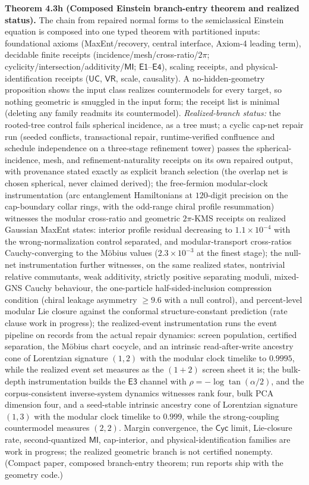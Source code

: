 \textbf{Theorem 4.3h (Composed Einstein branch-entry theorem and realized status).} The chain from repaired normal forms to the semiclassical Einstein equation is composed into one typed theorem with partitioned inputs: foundational axioms (MaxEnt/recovery, central interface, Axiom-4 leading term), decidable finite receipts (incidence/mesh/cross-ratio/\(2\pi\); cyclicity/intersection/additivity/\(\mathsf{MI}\); \(\mathsf{E1}\)--\(\mathsf{E4}\)), scaling receipts, and physical-identification receipts (\(\mathsf{UC}\), \(\mathsf{VR}\), scale, causality). A no-hidden-geometry proposition shows the input class realizes countermodels for every target, so nothing geometric is smuggled in the input form; the receipt list is minimal (deleting any family readmits its countermodel). \emph{Realized-branch status:} the rooted-tree control fails spherical incidence, as a tree must; a cyclic cap-net repair run (seeded conflicts, transactional repair, runtime-verified confluence and schedule independence on a three-stage refinement tower) passes the spherical-incidence, mesh, and refinement-naturality receipts on its own repaired output, with provenance stated exactly as explicit branch selection (the overlap net is chosen spherical, never claimed derived); the free-fermion modular-clock instrumentation (arc entanglement Hamiltonians at \(120\)-digit precision on the cap-boundary collar rings, with the odd-range chiral profile resummation) witnesses the modular cross-ratio and geometric \(2\pi\)-KMS receipts on realized Gaussian MaxEnt states: interior profile residual decreasing to \(1.1\times10^{-4}\) with the wrong-normalization control separated, and modular-transport cross-ratios Cauchy-converging to the M\"obius values (\(2.3\times10^{-3}\) at the finest stage); the null-net instrumentation further witnesses, on the same realized states, nontrivial relative commutants, weak additivity, strictly positive separating moduli, mixed-GNS Cauchy behaviour, the one-particle half-sided-inclusion compression condition (chiral leakage asymmetry \(\geq9.6\) with a null control), and percent-level modular Lie closure against the conformal structure-constant prediction (rate clause work in progress); the realized-event instrumentation runs the event pipeline on records from the actual repair dynamics: screen population, certified separation, the M\"obius chart cocycle, and an intrinsic read-after-write ancestry cone of Lorentzian signature \((1,2)\) with the modular clock timelike to \(0.9995\), while the realized event set measures as the \((1{+}2)\) screen sheet it is; the bulk-depth instrumentation builds the \(\mathsf{E3}\) channel with \(\rho=-\log\tan(\alpha/2)\), and the corpus-consistent inverse-system dynamics witnesses rank four, bulk PCA dimension four, and a seed-stable intrinsic ancestry cone of Lorentzian signature \((1,3)\) with the modular clock timelike to \(0.999\), while the strong-coupling countermodel measures \((2,2)\). Margin convergence, the \(\mathsf{Cyc}\) limit, Lie-closure rate, second-quantized \(\mathsf{MI}\), cap-interior, and physical-identification families are work in progress; the realized geometric branch is not certified nonempty. (Compact paper, composed branch-entry theorem; run reports ship with the geometry code.)

